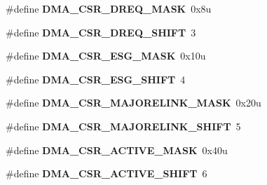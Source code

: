 \begin{DoxyCompactItemize}
\item 
\hypertarget{group___d_m_a___register___masks_ga5c490f9434d06e1bf11f5d5701dd546e}{}\#define {\bfseries D\+M\+A\+\_\+\+C\+S\+R\+\_\+\+D\+R\+E\+Q\+\_\+\+M\+A\+S\+K}~0x8u\label{group___d_m_a___register___masks_ga5c490f9434d06e1bf11f5d5701dd546e}

\item 
\hypertarget{group___d_m_a___register___masks_ga5932e5b14fcfbde57315d875dc3288fd}{}\#define {\bfseries D\+M\+A\+\_\+\+C\+S\+R\+\_\+\+D\+R\+E\+Q\+\_\+\+S\+H\+I\+F\+T}~3\label{group___d_m_a___register___masks_ga5932e5b14fcfbde57315d875dc3288fd}

\item 
\hypertarget{group___d_m_a___register___masks_ga58c5b388126424c012533eec1020e15d}{}\#define {\bfseries D\+M\+A\+\_\+\+C\+S\+R\+\_\+\+E\+S\+G\+\_\+\+M\+A\+S\+K}~0x10u\label{group___d_m_a___register___masks_ga58c5b388126424c012533eec1020e15d}

\item 
\hypertarget{group___d_m_a___register___masks_gaac36360d5090fc436e557ad8859046c4}{}\#define {\bfseries D\+M\+A\+\_\+\+C\+S\+R\+\_\+\+E\+S\+G\+\_\+\+S\+H\+I\+F\+T}~4\label{group___d_m_a___register___masks_gaac36360d5090fc436e557ad8859046c4}

\item 
\hypertarget{group___d_m_a___register___masks_gaeb6466fd98e1ae2a8f7a682124192b97}{}\#define {\bfseries D\+M\+A\+\_\+\+C\+S\+R\+\_\+\+M\+A\+J\+O\+R\+E\+L\+I\+N\+K\+\_\+\+M\+A\+S\+K}~0x20u\label{group___d_m_a___register___masks_gaeb6466fd98e1ae2a8f7a682124192b97}

\item 
\hypertarget{group___d_m_a___register___masks_ga661ffd80f2647e1b9494de637a8a89bf}{}\#define {\bfseries D\+M\+A\+\_\+\+C\+S\+R\+\_\+\+M\+A\+J\+O\+R\+E\+L\+I\+N\+K\+\_\+\+S\+H\+I\+F\+T}~5\label{group___d_m_a___register___masks_ga661ffd80f2647e1b9494de637a8a89bf}

\item 
\hypertarget{group___d_m_a___register___masks_ga1e57ad208a3340d3f00b4470e5d039ff}{}\#define {\bfseries D\+M\+A\+\_\+\+C\+S\+R\+\_\+\+A\+C\+T\+I\+V\+E\+\_\+\+M\+A\+S\+K}~0x40u\label{group___d_m_a___register___masks_ga1e57ad208a3340d3f00b4470e5d039ff}

\item 
\hypertarget{group___d_m_a___register___masks_ga74b734e2edf221545bb66ade093a8875}{}\#define {\bfseries D\+M\+A\+\_\+\+C\+S\+R\+\_\+\+A\+C\+T\+I\+V\+E\+\_\+\+S\+H\+I\+F\+T}~6\label{group___d_m_a___register___masks_ga74b734e2edf221545bb66ade093a8875}


\end{DoxyCompactItemize}
